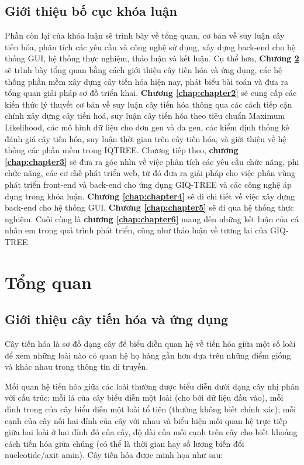 \documentclass[12pt]{report}
\begin{document}
\section{Giới thiệu bố cục khóa luận}
Phần còn lại của khóa luận sẽ trình bày về tổng quan, cơ bản về suy luận cây tiến hóa, phân tích các yêu cầu và công nghệ sử dụng, xây dựng back-end cho hệ thống GUI, hệ thống thực nghiệm, thảo luận và kết luận. Cụ thể hơn, \textbf{Chương \ref{chap:chapter1}} sẽ trình bày tổng quan bằng cách giới thiệu cây tiến hóa và ứng dụng, các hệ thống phần mềm xây dựng cây tiến hóa hiện nay, phát biểu bài toán và đưa ra tổng quan giải pháp sơ đồ triển khai. \textbf{Chương \ref{chap:chapter2}} sẽ cung cấp các kiến thức lý thuyết cơ bản về suy luận cây tiến hóa thông qua các cách tiếp cận chính xây dựng cây tiến hoá, suy luận cây tiến hóa theo tiêu chuẩn Maximum Likelihood, các mô hình dữ liệu cho đơn gen và đa gen, các kiểm định thống kê đánh giá cây tiến hóa, suy luận thời gian trên cây tiến hóa, và giới thiệu về hệ thống các phần mềm trong IQTREE.
Chương tiếp theo, \textbf{chương \ref{chap:chapter3}} sẽ đưa ra góc nhìn về việc phân tích các yêu cầu chức năng, phi chức năng, các cơ chế phát triển web, từ đó đưa ra giải pháp cho việc phân vùng phát triển front-end và back-end cho ứng dụng GIQ-TREE và các công nghệ áp dụng trong khóa luận.	\textbf{Chương \ref{chap:chapter4}} sẽ đi chi tiết về việc xây dựng back-end cho hệ thống GUI. \textbf{Chương \ref{chap:chapter5}} sẽ đi qua hệ thống thực nghiệm. Cuối cùng là \textbf{chương \ref{chap:chapter6}} mang đến những kết luận của cá nhân em trong quá trình phát triển, cũng như thảo luận về tương lai của GIQ-TREE
\newpage	
\chapter{Tổng quan}
\label{chap:chapter1}
\section{Giới thiệu cây tiến hóa và ứng dụng}
Cây tiến hóa là sơ đồ dạng cây để biểu diễn quan hệ về tiến hóa giữa một số loài để xem những loài nào có quan hệ họ hàng gần hơn \cite{cia-0} \cite{cia-1}  dựa trên những điểm giống và khác nhau trong thông tin di truyền.

Mối quan hệ tiến hóa giữa các loài thường được biểu diễn dưới dạng cây nhị phân với cấu trúc: mỗi lá của cây biểu diễn một loài (cho bởi dữ liệu đầu vào), mỗi đỉnh trong của cây biểu diễn một loài tổ tiên (thường không biết chính xác); mỗi cạnh của cây nối hai đỉnh của cây với nhau và biểu hiện mối quan hệ trực tiếp giữa hai loài ở hai đỉnh đó của cây, độ dài của mỗi cạnh trên cây cho biết khoảng cách tiến hóa giữa chúng (có thể là thời gian hay số lượng biến đổi nucleotide/axit amin). Cây tiến hóa được minh họa như sau:
\end{document}
